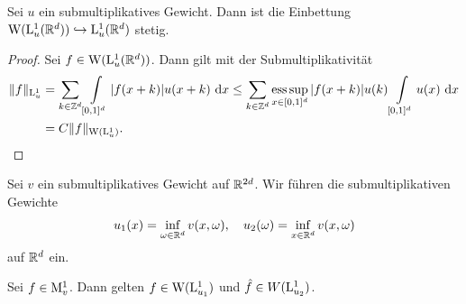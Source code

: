 \begin{sz}\label{th:embedding_amalagm_L1}
	Sei $ u $ ein submultiplikatives Gewicht.
	Dann ist die Einbettung $ \mathrm{W}(\mathrm{L}^1_u(\mathbb{R}^d)) \hookrightarrow \mathrm{L}^1_u(\mathbb{R}^d) $ stetig.
\end{sz}

\begin{proof}
	Sei $ f \in  \mathrm{W}(\mathrm{L}^1_u(\mathbb{R}^d))$.
	Dann gilt mit der Submultiplikativität
	\begin{align*}
	\| f \|_{\mathrm{L}^1_u}
	&= 
	\sum \limits_{k \in \mathbb{Z}^d}  \int \limits_{[0,1]^d} | f(x+k) | u(x+ k) \text{ d} x
	\leq 
	\sum \limits_{k \in \mathbb{Z}^d} \operatorname*{ess\,sup}_{x \in [0,1]^d} |f(x+k)| u(k) 
	\int \limits_{[0,1]^d} u(x) \text{ d} x\\
	&= C \| f \|_{\mathrm{W}(\mathrm{L}^1_u)}.
	\end{align*}
\end{proof}

\begin{df}
	Sei $ v $ ein submultiplikatives Gewicht auf $ \mathbb{R}^{2d} $.
	Wir führen die submultiplikativen Gewichte
	\begin{align*}
	u_1(x) = \inf \limits_{\omega \in \mathbb{R}^d} v(x,\omega),
	\quad 
	u_2(\omega) = \inf \limits_{x \in \mathbb{R}^d} v(x,\omega)
	\end{align*}
	auf $ \mathbb{R}^d $ ein.
\end{df}

\begin{lem}\label{th:am_space}
	Sei $ f \in \mathrm{M}^1_v $.
	Dann gelten $ f \in \mathrm{W}(\mathrm{L}^1_{u_1}) $ und $ \hat{f} \in W(\mathrm{L}^1_{u_2}) $.
\end{lem}

